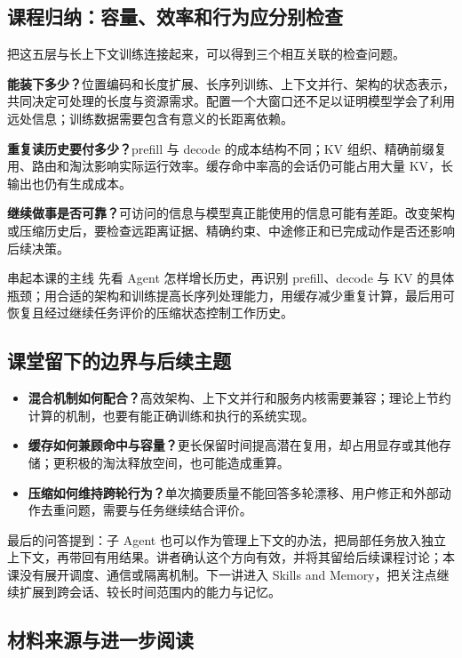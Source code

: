 \documentclass[11pt,a4paper]{article}
\begin{document}
\subsection{课程归纳：容量、效率和行为应分别检查}

把这五层与长上下文训练连接起来，可以得到三个相互关联的检查问题。

\textbf{能装下多少？}位置编码和长度扩展、长序列训练、上下文并行、架构的状态表示，共同决定可处理的长度与资源需求。配置一个大窗口还不足以证明模型学会了利用远处信息；训练数据需要包含有意义的长距离依赖。

\textbf{重复读历史要付多少？}prefill 与 decode 的成本结构不同；KV 组织、精确前缀复用、路由和淘汰影响实际运行效率。缓存命中率高的会话仍可能占用大量 KV，长输出也仍有生成成本。

\textbf{继续做事是否可靠？}可访问的信息与模型真正能使用的信息可能有差距。改变架构或压缩历史后，要检查远距离证据、精确约束、中途修正和已完成动作是否还影响后续决策。

\begin{importantbox}{串起本课的主线}
先看 Agent 怎样增长历史，再识别 prefill、decode 与 KV 的具体瓶颈；用合适的架构和训练提高长序列处理能力，用缓存减少重复计算，最后用可恢复且经过继续任务评价的压缩状态控制工作历史。
\end{importantbox}

\subsection{课堂留下的边界与后续主题}

\begin{itemize}
\item \textbf{混合机制如何配合？}高效架构、上下文并行和服务内核需要兼容；理论上节约计算的机制，也要有能正确训练和执行的系统实现。
\item \textbf{缓存如何兼顾命中与容量？}更长保留时间提高潜在复用，却占用显存或其他存储；更积极的淘汰释放空间，也可能造成重算。
\item \textbf{压缩如何维持跨轮行为？}单次摘要质量不能回答多轮漂移、用户修正和外部动作去重问题，需要与任务继续结合评价。
\end{itemize}

最后的问答提到：子 Agent 也可以作为管理上下文的办法，把局部任务放入独立上下文，再带回有用结果。讲者确认这个方向有效，并将其留给后续课程讨论；本课没有展开调度、通信或隔离机制。下一讲进入 Skills and Memory，把关注点继续扩展到跨会话、较长时间范围内的能力与记忆。

\subsection{材料来源与进一步阅读}
\end{document}

